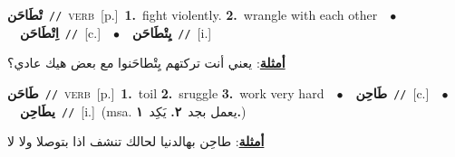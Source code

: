 \documentclass[10pt,a4paper,twoside]{article} %
\begin{document}
\begin{multicols}{2}
{\setlength\topsep{0pt}\textbf{\foreignlanguage{arabic}{تْطَاحَن}}\ {\color{gray}\texttt{//}\color{black}}\ \textsc{verb}\ [p.]\ \textbf{1.}~fight violently.  \textbf{2.}~wrangle with each other\ \ $\bullet$\ \ \setlength\topsep{0pt}\textbf{\foreignlanguage{arabic}{اِتْطَاحَن}}\ {\color{gray}\texttt{//}\color{black}}\ [c.]\ \ $\bullet$\ \ \setlength\topsep{0pt}\textbf{\foreignlanguage{arabic}{يِتْطَاحَن}}\ {\color{gray}\texttt{//}\color{black}}\ [i.]\  \begin{flushright}\color{gray}\foreignlanguage{arabic}{\textbf{\underline{\foreignlanguage{arabic}{أمثلة}}}: يعني أنت تركتهم يِتْطاحَنوا مع بعض هيك عادي؟}\end{flushright}\color{black}} \vspace{2mm}

{\setlength\topsep{0pt}\textbf{\foreignlanguage{arabic}{طَاحَن}}\ {\color{gray}\texttt{//}\color{black}}\ \textsc{verb}\ [p.]\ \textbf{1.}~toil  \textbf{2.}~sruggle  \textbf{3.}~work very hard\ \ $\bullet$\ \ \setlength\topsep{0pt}\textbf{\foreignlanguage{arabic}{طَاحِن}}\ {\color{gray}\texttt{//}\color{black}}\ [c.]\ \ $\bullet$\ \ \setlength\topsep{0pt}\textbf{\foreignlanguage{arabic}{يطَاحِن}}\ {\color{gray}\texttt{//}\color{black}}\ [i.]\ \color{gray}(msa. \foreignlanguage{arabic}{يعمل بجد}~\foreignlanguage{arabic}{\textbf{٢.}}  \foreignlanguage{arabic}{يَكِد}~\foreignlanguage{arabic}{\textbf{١.}})\color{black}\  \begin{flushright}\color{gray}\foreignlanguage{arabic}{\textbf{\underline{\foreignlanguage{arabic}{أمثلة}}}: طاحِن بهالدنيا لحالك تنشف اذا بتوصلا ولا لا}\end{flushright}\color{black}} \vspace{2mm}


\end{multicols}
\end{document}
